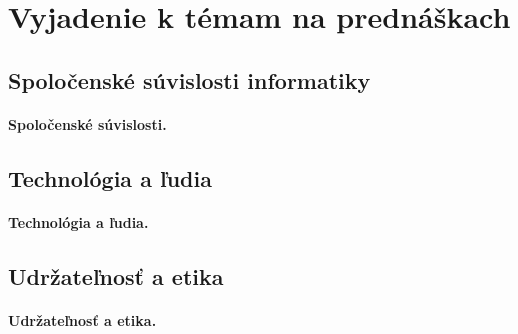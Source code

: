 \documentclass[10pt,twoside,slovak,a4paper]{article}
\begin{document}

\section{Vyjadenie k témam na prednáškach}

\subsection{Spoločenské súvislosti informatiky}

\paragraph{Spoločenské súvislosti.} 

\subsection{Technológia a ľudia}

\paragraph{Technológia a ľudia.} 

\subsection{Udržateľnosť a etika}

\paragraph{Udržateľnosť a etika.} 



 
\end{document}
